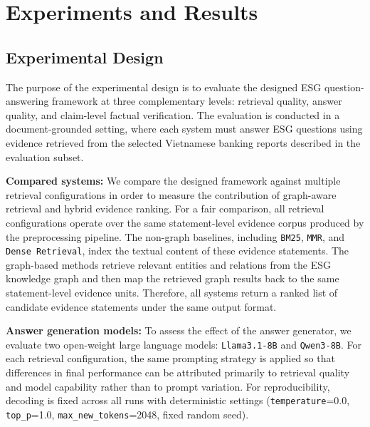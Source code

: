 \documentclass[sn-mathphys, oneside]{sn-jnl}
\begin{document}
\section{Experiments and Results}
\label{sec:experiments}

\subsection{Experimental Design}

The purpose of the experimental design is to evaluate the designed ESG question-answering
framework at three complementary levels: retrieval quality, answer quality, and
claim-level factual verification. The evaluation is conducted in a document-grounded
setting, where each system must answer ESG questions using evidence retrieved from the
selected Vietnamese banking reports described in the evaluation subset.

\textbf{Compared systems: }We compare the designed framework against multiple retrieval configurations in order to
measure the contribution of graph-aware retrieval and hybrid evidence ranking. For a fair comparison, all retrieval configurations operate over the same
statement-level evidence corpus produced by the preprocessing pipeline. The
non-graph baselines, including \texttt{BM25}, \texttt{MMR}, and
\texttt{Dense Retrieval}, index the textual content of these evidence statements.
The graph-based methods retrieve relevant entities and relations from the ESG
knowledge graph and then map the retrieved graph results back to the same
statement-level evidence units. Therefore, all systems return a ranked list of
candidate evidence statements under the same output format.

\textbf{Answer generation models:} To assess the effect of the answer generator, we evaluate two open-weight large language
models: \texttt{Llama3.1-8B} and \texttt{Qwen3-8B}. For each retrieval configuration,
the same prompting strategy is applied so that differences in final performance can be
attributed primarily to retrieval quality and model capability rather than to prompt variation.
For reproducibility, decoding is fixed across all runs with deterministic settings
(\texttt{temperature}=0.0, \texttt{top\_p}=1.0, \texttt{max\_new\_tokens}=2048,
fixed random seed).
\end{document}
